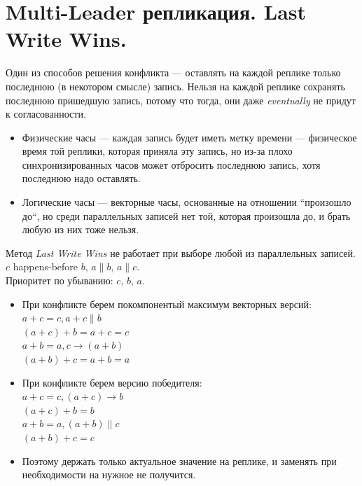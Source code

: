 \section{Multi-Leader репликация. Last Write Wins.}
    Один из способов решения конфликта --- оставлять на каждой реплике только последнюю (в некотором смысле) запись. Нельзя на каждой реплике сохранять последнюю пришедшую запись, потому что тогда, они даже \textit{eventually} не придут к согласованности.
    \begin{itemize}
        \item Физические часы --- каждая запись будет иметь метку времени --- физическое время той реплики, которая приняла эту запись, но из-за плохо синхронизированных часов может отбросить последнюю запись, хотя последнюю надо оставлять.
        \item Логические часы --- векторные часы, основанные на отношении ``произошло до``, но среди параллельных записей нет той, которая произошла до, и брать любую из них тоже нельзя.
    \end{itemize}
      \begin{definition}
        Метод \textit{Last Write Wins} не работает при выборе любой из параллельных записей.\\
          $c$ happens-before $b$, $a \parallel b$, $a \parallel c$. \\
          Приоритет по убыванию: $c$, $b$, $a$. \\
          \begin{itemize}
          \item При конфликте берем покомпонентый максимум векторных версий:\\
            $a + c = c, a + c \parallel b$\\
            $(a + c) + b = a + c = c$\\
            $a + b = a, c \rightarrow (a + b)$\\
            $(a + b) + c = a + b = a$\\
          \item При конфликте берем версию победителя:\\
            $a + c = c, (a + c) \rightarrow b$\\
            $(a + c) + b = b$\\
            $a + b = a, (a + b) \parallel c$\\
            $(a + b) + c = c$
         \item Поэтому держать только актуальное значение на реплике, и заменять при необходимости на нужное не получится.
        \end{itemize}
      \end{definition}
